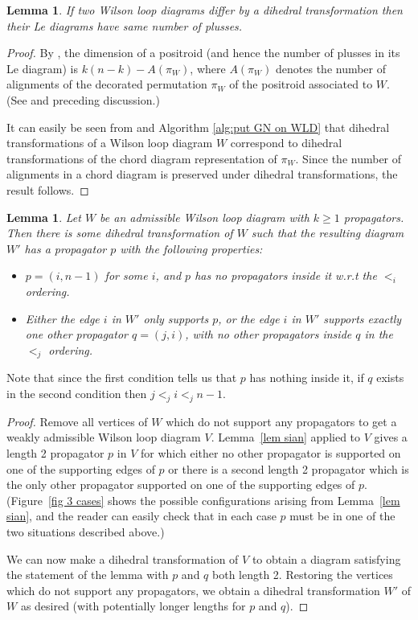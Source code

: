 \documentclass[11pt]{article}
\newtheorem{lem}[thm]{Lemma}
\theoremstyle{remark}
\theoremstyle{definition}
\begin{document}
\begin{lem}\label{lem dihedral}
If two Wilson loop diagrams differ by a dihedral transformation then their Le diagrams have same number of plusses.
\end{lem}
\begin{proof}
By \cite[Proposition 17.10]{Postnikov}, the dimension of a positroid (and hence the number of plusses in its Le diagram) is $k(n-k) - A(\pi_W)$, where $A(\pi_W)$ denotes the number of alignments of the decorated permutation $\pi_W$ of the positroid associated to $W$. (See \cite[Figure 17.1]{Postnikov} and preceding discussion.)

It can easily be seen from \cite[Section 17]{Postnikov} and Algorithm \ref{alg:put GN on WLD} that dihedral transformations of a Wilson loop diagram $W$ correspond to dihedral transformations of the chord diagram representation of $\pi_W$. Since the number of alignments in a chord diagram is preserved under dihedral transformations, the result follows.
\end{proof}


\begin{lem}\label{lem good p}
  Let $W$ be an admissible Wilson loop diagram with $k \geq 1$ propagators.  Then there is some dihedral transformation of $W$ such that the resulting diagram $W'$ has a propagator $p$ with the following properties:
  \begin{itemize}
  \item $p = (i, n-1)$ for some $i$, and $p$ has no propagators inside it w.r.t the $<_i$ ordering.
  \item Either the edge $i$ in $W'$ only supports $p$, or the edge $i$ in $W'$ supports exactly one other propagator $q = (j,i)$, with no other propagators inside $q$ in the $<_j$ ordering. 
  \end{itemize}
\end{lem}
Note that since the first condition tells us that $p$ has nothing inside it, if $q$ exists in the second condition then $j<_ji<_jn-1$. 

\begin{proof}
  Remove all vertices of $W$ which do not support any propagators to get a weakly admissible Wilson loop diagram $V$.  Lemma~\ref{lem sian} applied to $V$ gives a length 2 propagator $p$ in $V$ for which either no other propagator is supported on one of the supporting edges of $p$ or there is a second length 2 propagator which is the only other propagator supported on one of the supporting edges of $p$.  (Figure~\ref{fig 3 cases} shows the possible configurations arising from Lemma~\ref{lem sian}, and the reader can easily check that in each case $p$ must be in one of the two situations described above.)

  We can now make a dihedral transformation of $V$ to obtain a diagram satisfying the statement of the lemma with $p$ and $q$ both length 2. Restoring the vertices which do not support any propagators, we obtain a dihedral transformation $W'$ of $W$ as desired (with potentially longer lengths for $p$ and $q$).
\end{proof}
\end{document}
